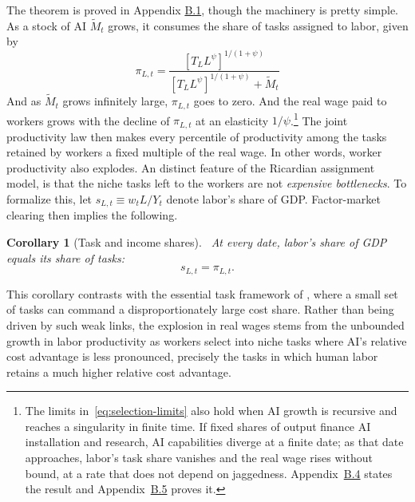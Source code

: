 \documentclass[11pt]{article}
\newtheorem{corollary}{Corollary}
\begin{document}
The theorem is proved in Appendix \href{https://ahmadlp.github.io/Lashkaripour_AI_Displacement_Online_Appendix.pdf\#page=13}{B.1}, though
the machinery is pretty simple. As a stock of AI $\widetilde{M}_{t}$
grows, it consumes the share of tasks assigned to labor, given by
\begin{equation}
\pi_{L,t}=\frac{[T_{L}L^{\psi}]^{1/(1+\psi)}}{[T_{L}L^{\psi}]^{1/(1+\psi)}+\widetilde{M}_{t}}\label{eq: Ricardian-assignment}
\end{equation}
And as $\widetilde{M}_{t}$ grows infinitely large, $\pi_{L,t}$ goes
to zero. And the real wage paid to workers grows with the decline
of $\pi_{L,t}$ at an elasticity $1/\psi$.\footnote{The limits in~\eqref{eq:selection-limits} also hold when AI growth
is recursive and reaches a singularity in finite time. If fixed shares
of output finance AI installation and research, AI capabilities diverge
at a finite date; as that date approaches, labor's task share vanishes
and the real wage rises without bound, at a rate that does not depend
on jaggedness. Appendix~\href{https://ahmadlp.github.io/Lashkaripour_AI_Displacement_Online_Appendix.pdf\#page=24}{B.4} states the result
and Appendix~\href{https://ahmadlp.github.io/Lashkaripour_AI_Displacement_Online_Appendix.pdf\#page=25}{B.5} proves it.} The joint productivity law then makes every percentile of productivity
among the tasks retained by workers a fixed multiple of the real wage.
In other words, worker productivity also explodes. An distinct feature
of the Ricardian assignment model, is that the niche tasks left to
the workers are not \emph{expensive bottlenecks}. To formalize this,
let $s_{L,t}\equiv w_{t}L/Y_{t}$ denote labor's share of GDP. Factor-market
clearing then implies the following.

\begin{corollary}[Task and income shares]\label{cor:task-income-shares}
~At every date, labor's share of GDP equals its share of tasks:
\[
s_{L,t}=\pi_{L,t}.
\]
\end{corollary}

This corollary contrasts with the essential task framework of \citet{jt2026},
where a small set of tasks can command a disproportionately large
cost share. Rather than being driven by such weak links, the explosion
in real wages stems from the unbounded growth in labor productivity
as workers select into niche tasks where AI's relative cost advantage
is less pronounced, precisely the tasks in which human labor retains
a much higher relative cost advantage.
\end{document}
